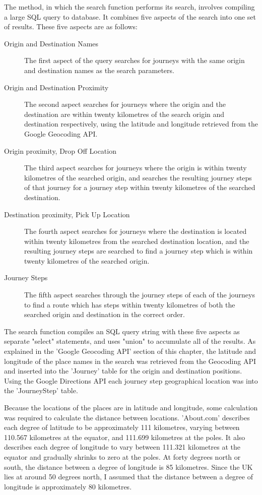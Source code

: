 The method, in which the search function performs its search, involves compiling a large SQL query to database. It combines five aspects of the search into one set of results. These five aspects are as follows:

\begin{description}
\item[Origin and Destination Names] The first aspect of the query searches for journeys with the same origin and destination names as the search parameters. 
\item[Origin and Destination Proximity] The second aspect searches for journeys where the origin and the destination are within twenty kilometres of the search origin and destination respectively, using the latitude and longitude retrieved from the Google Geocoding API.
\item[Origin proximity, Drop Off Location] The third aspect searches for journeys where the origin is within twenty kilometres of the searched origin, and searches the resulting journey steps of that journey for a journey step within twenty kilometres of the searched destination.
\item[Destination proximity, Pick Up Location] The fourth aspect searches for journeys where the destination is located within twenty kilometres from the searched destination location, and the resulting journey steps are searched to find a journey step which is within twenty kilometres of the searched origin.
\item[Journey Steps] The fifth aspect searches through the journey steps of each of the journeys to find a route which has steps within twenty kilometres of both the searched origin and destination in the correct order.
\end{description}

The search function compiles an SQL query string with these five aspects as separate "select" statements, and uses "union" to accumulate all of the results. As explained in the 'Google Geocoding API' section of this chapter, the latitude and longitude of the place names in the search was retrieved from the Geocoding API and inserted into the 'Journey' table for the origin and destination positions. Using the Google Directions API each journey step geographical location was into the 'Journey\textunderscore Step' table. 

Because the locations of the places are in latitude and longitude, some calculation was required to calculate the distance between locations. 'About.com' describes each degree of latitude to be approximately 111 kilometres, varying between 110.567 kilometres at the equator, and 111.699 kilometres at the poles. It also describes each degree of longitude to vary between 111.321 kilometres at the equator and gradually shrinks to zero at the poles\cite{about_com_distances}. At forty degrees north or south, the distance between a degree of longitude is 85 kilometres. Since the UK lies at around 50 degrees north, I assumed that the distance between a degree of longitude is approximately 80 kilometres. 

